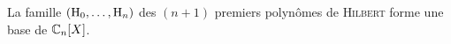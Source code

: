 \begin{prop}
    La famille $(\mathrm{H}_0, \dots, \mathrm{H}_n)$ des $(n+1)$ premiers polynômes de \textsc{Hilbert} forme une base de $\mathbb{C}_n[X]$.
\end{prop}

\begin{preuve}
\end{preuve}